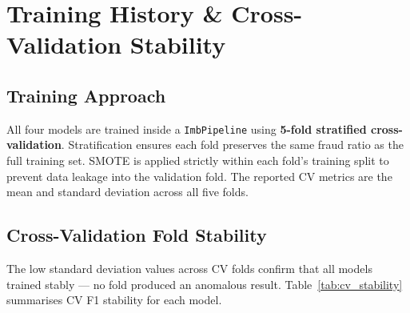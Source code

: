 \documentclass[12pt,a4paper]{article}
\begin{document}
\section{Training History \& Cross-Validation Stability}

\label{sec:training_history}

\subsection{Training Approach}

All four models are trained inside a \texttt{ImbPipeline} using \textbf{5-fold stratified cross-validation}. Stratification ensures each fold preserves the same fraud ratio as the full training set. SMOTE is applied strictly within each fold's training split to prevent data leakage into the validation fold. The reported CV metrics are the mean and standard deviation across all five folds.

\subsection{Cross-Validation Fold Stability}

The low standard deviation values across CV folds confirm that all models trained stably — no fold produced an anomalous result. Table~\ref{tab:cv_stability} summarises CV F1 stability for each model.

\begin{table}[H]
\centering
\caption{Cross-Validation Stability Summary --- CV F1 Mean $\pm$ Std Across 5 Folds}
\label{tab:cv_stability}
\end{table}
\end{document}
